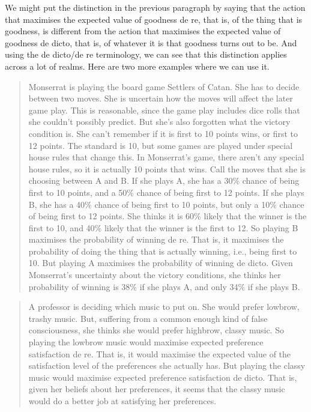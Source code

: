 \documentclass[
  10pt,
  letterpaper,
  twoside]{scrbook}
\begin{document}
We might put the distinction in the previous paragraph by saying that
the action that maximises the expected value of goodness de re, that is,
of the thing that is goodness, is different from the action that
maximises the expected value of goodness de dicto, that is, of whatever
it is that goodness turns out to be. And using the de dicto/de re
terminology, we can see that this distinction applies across a lot of
realms. Here are two more examples where we can use it.

\begin{quote}
{Monserrat} is playing the board game Settlers of Catan. She has to
decide between two moves. She is uncertain how the moves will affect the
later game play. This is reasonable, since the game play includes dice
rolls that she couldn't possibly predict. But she's also forgotten what
the victory condition is. She can't remember if it is first to 10 points
wins, or first to 12 points. The standard is 10, but some games are
played under special house rules that change this. In {Monserrat}'s
game, there aren't any special house rules, so it is actually 10 points
that wins. Call the moves that she is choosing between A and B. If she
plays A, she has a 30\% chance of being first to 10 points, and a 50\%
chance of being first to 12 points. If she plays B, she has a 40\%
chance of being first to 10 points, but only a 10\% chance of being
first to 12 points. She thinks it is 60\% likely that the winner is the
first to 10, and 40\% likely that the winner is the first to 12. So
playing B maximises the probability of winning de re. That is, it
maximises the probability of doing the thing that is actually winning,
i.e., being first to 10. But playing A maximises the probability of
winning de dicto. Given {Monserrat}'s uncertainty about the victory
conditions, she thinks her probability of winning is 38\% if she plays
A, and only 34\% if she plays B.
\end{quote}

\begin{quote}
A professor is deciding which music to put on. She would prefer lowbrow,
trashy music. But, suffering from a common enough kind of false
consciousness, she thinks she would prefer highbrow, classy music. So
playing the lowbrow music would maximise expected preference
satisfaction de re. That is, it would maximise the expected value of the
satisfaction level of the preferences she actually has. But playing the
classy music would maximise expected preference satisfaction de dicto.
That is, given her beliefs about her preferences, it seems that the
classy music would do a better job at satisfying her preferences.
\end{quote}
\end{document}
